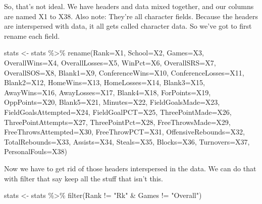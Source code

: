 \documentclass[
]{book}
\newenvironment{Shaded}{\begin{snugshade}}{\end{snugshade}}
\newcommand{\AttributeTok}[1]{\textcolor[rgb]{0.77,0.63,0.00}{#1}}
\newcommand{\FunctionTok}[1]{\textcolor[rgb]{0.00,0.00,0.00}{#1}}
\newcommand{\NormalTok}[1]{#1}
\newcommand{\OtherTok}[1]{\textcolor[rgb]{0.56,0.35,0.01}{#1}}
\newcommand{\SpecialCharTok}[1]{\textcolor[rgb]{0.00,0.00,0.00}{#1}}
\newcommand{\StringTok}[1]{\textcolor[rgb]{0.31,0.60,0.02}{#1}}
\begin{document}
So, that's not ideal. We have headers and data mixed together, and our columns are named X1 to X38. Also note: They're all character fields. Because the headers are interspersed with data, it all gets called character data. So we've got to first rename each field.

\begin{Shaded}
\begin{Highlighting}[]
\NormalTok{stats }\OtherTok{\textless{}{-}}\NormalTok{ stats }\SpecialCharTok{\%\textgreater{}\%} \FunctionTok{rename}\NormalTok{(}\AttributeTok{Rank=}\NormalTok{X1, }\AttributeTok{School=}\NormalTok{X2, }\AttributeTok{Games=}\NormalTok{X3, }\AttributeTok{OverallWins=}\NormalTok{X4, }\AttributeTok{OverallLosses=}\NormalTok{X5, }\AttributeTok{WinPct=}\NormalTok{X6, }\AttributeTok{OverallSRS=}\NormalTok{X7, }\AttributeTok{OverallSOS=}\NormalTok{X8, }\AttributeTok{Blank1=}\NormalTok{X9, }\AttributeTok{ConferenceWins=}\NormalTok{X10, }\AttributeTok{ConferenceLosses=}\NormalTok{X11, }\AttributeTok{Blank2=}\NormalTok{X12, }\AttributeTok{HomeWins=}\NormalTok{X13, }\AttributeTok{HomeLosses=}\NormalTok{X14, }\AttributeTok{Blank3=}\NormalTok{X15, }\AttributeTok{AwayWins=}\NormalTok{X16, }\AttributeTok{AwayLosses=}\NormalTok{X17, }\AttributeTok{Blank4=}\NormalTok{X18, }\AttributeTok{ForPoints=}\NormalTok{X19, }\AttributeTok{OppPoints=}\NormalTok{X20, }\AttributeTok{Blank5=}\NormalTok{X21, }\AttributeTok{Minutes=}\NormalTok{X22, }\AttributeTok{FieldGoalsMade=}\NormalTok{X23, }\AttributeTok{FieldGoalsAttempted=}\NormalTok{X24, }\AttributeTok{FieldGoalPCT=}\NormalTok{X25, }\AttributeTok{ThreePointMade=}\NormalTok{X26, }\AttributeTok{ThreePointAttempts=}\NormalTok{X27, }\AttributeTok{ThreePointPct=}\NormalTok{X28, }\AttributeTok{FreeThrowsMade=}\NormalTok{X29, }\AttributeTok{FreeThrowsAttempted=}\NormalTok{X30, }\AttributeTok{FreeThrowPCT=}\NormalTok{X31, }\AttributeTok{OffensiveRebounds=}\NormalTok{X32, }\AttributeTok{TotalRebounds=}\NormalTok{X33, }\AttributeTok{Assists=}\NormalTok{X34, }\AttributeTok{Steals=}\NormalTok{X35, }\AttributeTok{Blocks=}\NormalTok{X36, }\AttributeTok{Turnovers=}\NormalTok{X37, }\AttributeTok{PersonalFouls=}\NormalTok{X38)}
\end{Highlighting}
\end{Shaded}

Now we have to get rid of those headers interspersed in the data. We can do that with filter that say keep all the stuff that isn't this.

\begin{Shaded}
\begin{Highlighting}[]
\NormalTok{stats }\OtherTok{\textless{}{-}}\NormalTok{ stats }\SpecialCharTok{\%\textgreater{}\%} \FunctionTok{filter}\NormalTok{(Rank }\SpecialCharTok{!=} \StringTok{"Rk"} \SpecialCharTok{\&}\NormalTok{ Games }\SpecialCharTok{!=} \StringTok{"Overall"}\NormalTok{) }
\end{Highlighting}
\end{Shaded}
\end{document}
